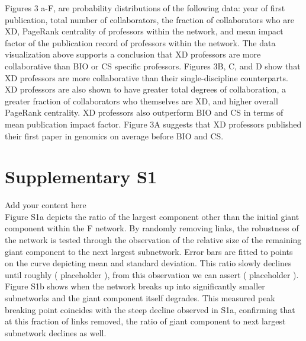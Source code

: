 \documentclass[10pt]{article}         %
\begin{document}
Figures 3 a-F, are probability distributions of the following data: year of first publication, total number of collaborators, the fraction of collaborators who are XD, PageRank centrality of professors within the network, and mean impact factor of the publication record of professors within the network. The data visualization above supports a conclusion that XD professors are more collaborative than BIO or CS specific professors. Figures 3B, C, and D show that XD professors are more collaborative than their single-discipline counterparts. XD professors are also shown to have greater total degrees of collaboration, a greater fraction of collaborators who themselves are XD, and higher overall PageRank centrality. XD professors also outperform BIO and CS in terms of mean publication impact factor. Figure 3A suggests that XD professors published their first paper in genomics on average before BIO and CS. 

\newpage
\section{Supplementary S1}
Add your content here\\
Figure S1a depicts the ratio of the largest component other than the initial giant component within the F network. By randomly removing links, the robustness of the network is tested through the observation of the relative size of the remaining giant component to the next largest subnetwork. Error bars are fitted to points on the curve depicting mean and standard deviation. This ratio slowly declines until roughly ( placeholder ), from this observation we can assert ( placeholder ). Figure S1b shows when the network breaks up into significantly smaller subnetworks and the giant component itself degrades. This measured peak breaking point coincides with the steep decline observed in S1a, confirming that at this fraction of links removed, the ratio of giant component to next largest subnetwork declines as well. 

\newpage
\end{document}
